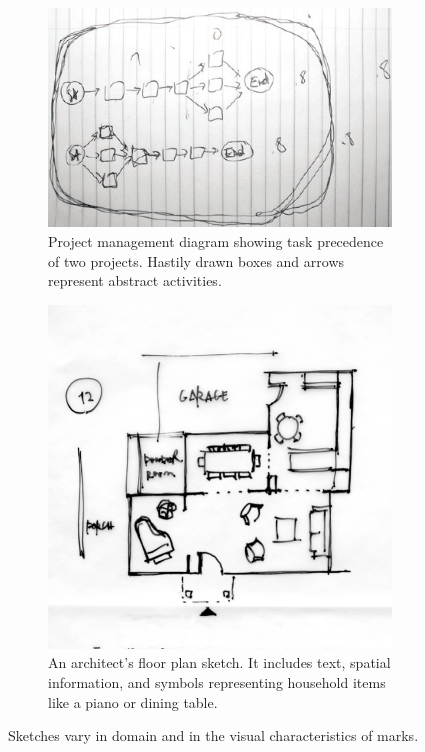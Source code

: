 \begin{figure}
  \centering
  \begin{subfigure}[b]{0.42\textwidth}
    \includegraphics[width=\linewidth]{img/sketch-type-project-management.pdf}
    \caption{Project management diagram showing task precedence of two
      projects. Hastily drawn boxes and arrows represent abstract
      activities.}
    \label{fig:sketch-type-pm}
  \end{subfigure}
  \hspace{1cm}
  \begin{subfigure}[b]{0.42\textwidth}
    \includegraphics[width=\linewidth]{img/sketch-type-architecture.pdf}
    \caption{An architect's floor plan sketch. It includes text, 
      spatial information, and symbols representing household
      items like a piano or dining table.}
    \label{fig:sketch-type-architecture}
  \end{subfigure}
  
  \caption[Project Management and Architecture Sketches]{Sketches vary
    in domain and in the visual characteristics of marks.}
  \label{fig:types-of-sketches}

\end{figure}

